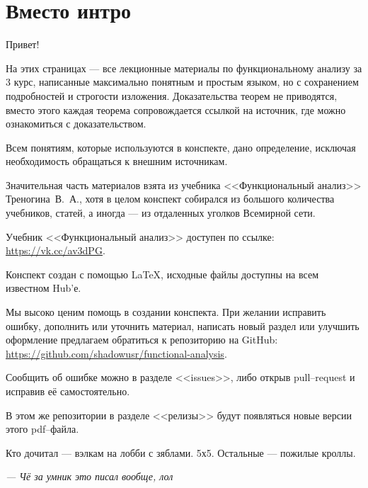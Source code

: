 \section*{Вместо интро}
Привет!

На этих страницах --- все лекционные материалы по функциональному анализу за 3 курс, написанные максимально понятным и простым языком, но с сохранением подробностей и строгости изложения. Доказательства теорем не приводятся, вместо этого каждая теорема сопровождается ссылкой на источник, где можно ознакомиться с доказательством.

Всем понятиям, которые используются в конспекте, дано определение, исключая необходимость обращаться к внешним источникам.

Значительная часть материалов взята из учебника <<Функциональный анализ>> Треногина~В.~А.\cite{trenogin}, хотя в целом конспект собирался из большого количества учебников, статей, а иногда --- из отдаленных уголков Всемирной сети.

Учебник <<Функциональный анализ>> доступен по ссылке: \url{https://vk.cc/av3dPG}.

Конспект создан с помощью \LaTeX, исходные файлы доступны на всем известном Hub'е.

Мы высоко ценим помощь в создании конспекта. При желании исправить ошибку, дополнить или уточнить материал, написать новый раздел или улучшить оформление предлагаем обратиться к репозиторию на GitHub: \url{https://github.com/shadowusr/functional-analysis}.

Сообщить об ошибке можно в разделе <<issues>>, либо открыв pull--request и исправив её самостоятельно.

В этом же репозитории в разделе <<релизы>> будут появляться новые версии этого pdf--файла.

Кто дочитал --- вэлкам на лобби с зяблами. 5х5. Остальные --- пожилые кроллы.

\begin{flushright}
	\textit{--- Чё за умник это писал вообще, лол}
\end{flushright}
